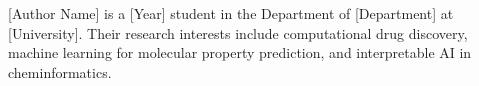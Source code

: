 \documentclass[lettersize,journal]{IEEEtran}
\begin{document}
\newpage
\begin{IEEEbiographynophoto}{[Author Name]}
is a [Year] student in the Department of [Department] at [University].
Their research interests include computational drug discovery, machine
learning for molecular property prediction, and interpretable AI in
cheminformatics.
\end{IEEEbiographynophoto}

\vfill
\end{document}
